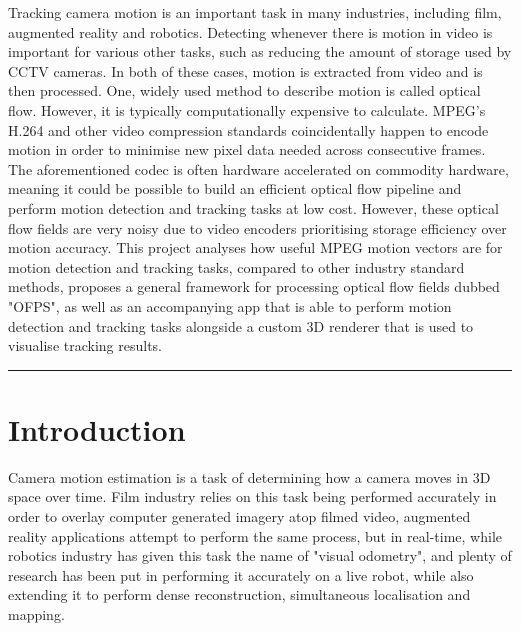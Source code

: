 \documentclass[11pt,english]{report}
\begin{document}
Tracking camera motion is an important task in many industries, including film, augmented reality and robotics. Detecting whenever there is motion in video is important for various other tasks, such as reducing the amount of storage used by CCTV cameras. In both of these cases, motion is extracted from video and is then processed. One, widely used method to describe motion is called optical flow. However, it is typically computationally expensive to calculate. MPEG's H.264 and other video compression standards coincidentally happen to encode motion in order to minimise new pixel data needed across consecutive frames. The aforementioned codec is often hardware accelerated on commodity hardware, meaning it could be possible to build an efficient optical flow pipeline and perform motion detection and tracking tasks at low cost. However, these optical flow fields are very noisy due to video encoders prioritising storage efficiency over motion accuracy. This project analyses how useful MPEG motion vectors are for motion detection and tracking tasks, compared to other industry standard methods, proposes a general framework for processing optical flow fields dubbed "OFPS", as well as an accompanying app that is able to perform motion detection and tracking tasks alongside a custom 3D renderer that is used to visualise tracking results.

\tableofcontents

\par\noindent\rule{\textwidth}{0.4pt}

\chapter{Introduction}

Camera motion estimation is a task of determining how a camera moves in 3D space over time. Film industry relies on this task being performed accurately in order to overlay computer generated imagery atop filmed video, augmented reality applications attempt to perform the same process, but in real-time, while robotics industry has given this task the name of "visual odometry", and plenty of research has been put in performing it accurately on a live robot, while also extending it to perform dense reconstruction, simultaneous localisation and mapping\cite{voldor-slam}.
\end{document}
